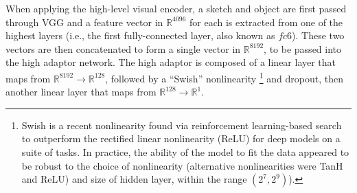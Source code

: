 \documentclass[9pt,twocolumn,twoside]{pnas-new}
\begin{document}
{%


When applying the high-level visual encoder, a sketch and object are first passed through VGG and a feature vector in $\mathbb{R}^{4096}$ for each is extracted from one of the highest layers (i.e., the first fully-connected layer, also known as $fc6$). These two vectors are then concatenated to form a single vector in $\mathbb{R}^{8192}$, to be passed into the high adaptor network. 
The high adaptor is composed of a linear layer that maps from $\mathbb{R}^{8192} \rightarrow \mathbb{R}^{128}$, followed by a ``Swish'' nonlinearity \footnote{Swish is a recent nonlinearity found via reinforcement learning-based search to outperform the rectified linear nonlinearity (ReLU) for deep models on a suite of tasks. In practice, the ability of the model to fit the data appeared to be robust to the choice of nonlinearity (alternative nonlinearities were TanH and ReLU) and size of hidden layer, within the range $(2^{7},2^{9})$).} \cite[]{ramachandran2018searching} and dropout, then another linear layer that maps from $\mathbb{R}^{128} \rightarrow \mathbb{R}^{1}$.

}
\end{document}
